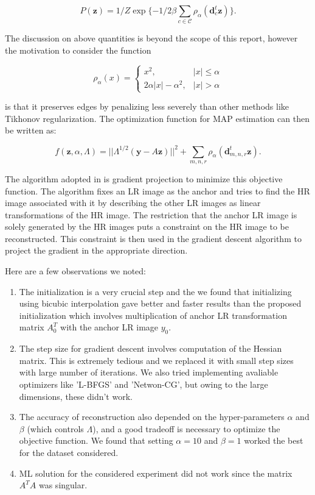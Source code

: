 \documentclass[10pt,twocolumn,letterpaper]{article}
\begin{document}
\begin{equation}
    P(\bm{z}) = 1/Z \exp\lbrace -1/2\beta \sum\limits_{c\in\mathcal{C}}\rho_\alpha (\bm{d}_c^t \bm{z}) \rbrace.
\end{equation} 

The discussion on above quantities is beyond the scope of this report, however the motivation to consider the function

\begin{equation}
\rho_\alpha(x) = 
\begin{cases}
x^2,  &|x|\leq \alpha\\
2\alpha |x|-\alpha^2, &|x|>\alpha 
\end{cases}
\end{equation}

is that it preserves edges by penalizing less severely than other methods like Tikhonov regularization. The optimization function for MAP estimation can then be written as:

\begin{equation}
    f(\bm{z},\alpha,\Lambda)=||\Lambda^{1/2}(\bm{y}-A\bm{z})||^2+\sum\limits_{m,n,r}\rho_\alpha(\bm{d}^t_{m,n,r}\bm{z}).
\end{equation}

The algorithm adopted in \cite{schultz1996extraction} is gradient projection to minimize this objective function. The algorithm fixes an LR image as the anchor and tries to find the HR image associated with it by describing the other LR images as linear transformations of the HR image. The restriction that the anchor LR image is solely generated by the HR images puts a constraint on the HR image to be reconstructed. This constraint is then used in the gradient descent algorithm to project the gradient in the appropriate direction.

Here are a few observations we noted:
\begin{enumerate}
    \item The initialization is a very crucial step and the we found that initializing using bicubic interpolation gave better and faster results than the proposed initialization which involves multiplication of anchor LR transformation matrix $A_0^T$ with the anchor LR image $y_0$.
    \item The step size for gradient descent involves computation of the Hessian matrix. This is extremely tedious and we replaced it with small step sizes with large number of iterations. We also tried implementing avaliable optimizers like 'L-BFGS' and 'Netwon-CG', but owing to the large dimensions, these didn't work.
    \item The accuracy of reconstruction also depended on the hyper-parameters $\alpha$ and $\beta$ (which controls $\Lambda$), and a good tradeoff is necessary to optimize the objective function. We found that setting $\alpha=10$ and $\beta=1$ worked the best for the dataset considered.
    
    \item ML solution for the considered experiment did not work since the matrix $A^T A$ was singular.
\end{enumerate}
\end{document}
